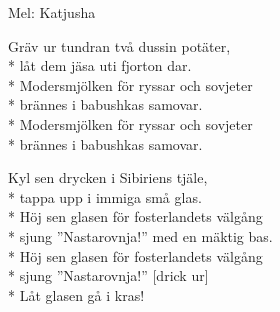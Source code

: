 \begin{SongText}
    \begin{SongInfo}
        Mel: Katjusha
    \end{SongInfo}
    \begin{SongVerse}
        Gräv ur tundran två dussin potäter,\\*%
        låt dem jäsa uti fjorton dar.\\*%
        Modersmjölken för ryssar och sovjeter\\*%
        brännes i babushkas samovar.\\*%
        Modersmjölken för ryssar och sovjeter\\*%
        brännes i babushkas samovar.
    \end{SongVerse}
    \begin{SongVerse}
        Kyl sen drycken i Sibiriens tjäle,\\*%
        tappa upp i immiga små glas.\\*%
        Höj sen glasen för fosterlandets välgång\\*%
        sjung ”Nastarovnja!” med en mäktig bas.\\*%
        Höj sen glasen för fosterlandets välgång\\*%
        sjung ”Nastarovnja!” [drick ur]\\*%
        Låt glasen gå i kras!
    \end{SongVerse}
\end{SongText}
